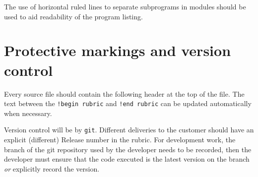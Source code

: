 \documentclass[11pt,twoside,a4paper]{report}
\newcommand{\T}[1]{{\tt #1}}
\begin{document}
The use of horizontal ruled lines to separate subprograms in modules
should be used to aid readability of the program listing.


\section{Protective markings and version control}\label{sec:prot-mark-git}

Every source file should contain the following header at the top
of the file.  The text between the \verb|!begin rubric| and 
\verb|!end rubric| can be updated automatically when necessary.


Version control will be by \T{git}. Different deliveries to the customer
should have an explicit (different) Release number in the rubric.
For development work, the branch of the git repository used by the developer
needs to be recorded, then the developer must ensure that the code executed
is the latest version on the branch \emph{or} explicitly record the version.
\end{document}

